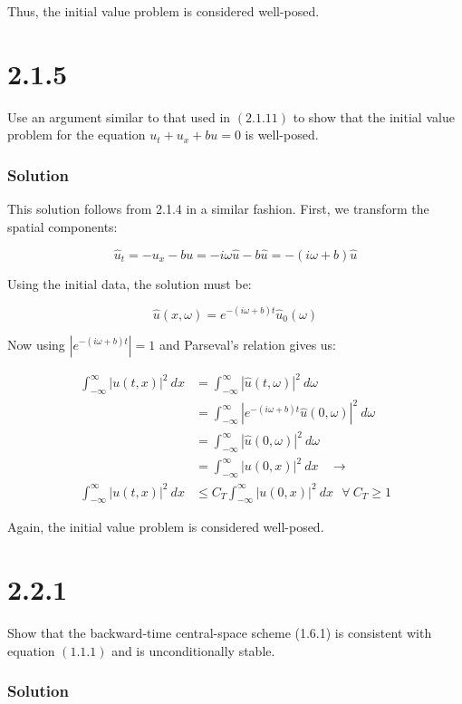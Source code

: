 \documentclass[12pt]{article}
\begin{document}
\noindent Thus, the initial value problem is considered well-posed.

\section*{2.1.5}
Use an argument similar to that used in $(2.1 .11)$ to show that the initial value problem for the equation $u_{t}+u_{x}+b u=0$ is well-posed.

\subsubsection*{Solution}

This solution follows from 2.1.4 in a similar fashion. First, we transform the spatial components:

$$ \hat{u}_t = -u_x-bu = -i\omega\hat{u} -b \hat{u} = -(i\omega + b)\hat{u}$$

\noindent Using the initial data, the solution must be:

$$ \hat{u}(x,\omega) = e^{-(i\omega + b)t}\hat{u}_0(\omega) $$

\noindent Now using $|e^{-(i\omega + b)t}|=1$ and Parseval's relation gives us:

\begin{equation*}
    \begin{aligned}
    \int_{-\infty}^\infty |u(t,x)|^2~dx & = \int_{-\infty}^\infty |\hat{u}(t,\omega)|^2~d\omega \\
    ~ &= \int_{-\infty}^\infty |e^{-(i\omega + b)t}\hat{u}(0, \omega)|^2~d\omega \\
    ~ &= \int_{-\infty}^\infty |\hat{u}(0, \omega)|^2~d\omega \\
    ~ &= \int_{-\infty}^\infty |u(0, x)|^2~dx ~~~~ \longrightarrow \\
    \int_{-\infty}^\infty |u(t,x)|^2~dx & \leq C_T\int_{-\infty}^\infty |u(0,x)|^2~dx ~~~ \forall ~C_T \geq 1
    \end{aligned}
\end{equation*}

\noindent Again, the initial value problem is considered well-posed.

\section*{2.2.1}
Show that the backward-time central-space scheme (1.6.1) is consistent with equation $(1.1 .1)$ and is unconditionally stable.

\subsubsection*{Solution}
\end{document}

